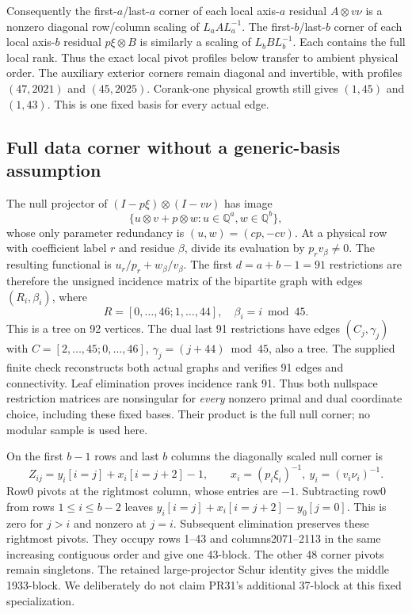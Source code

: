 \documentclass[11pt]{article}
\begin{document}
Consequently the first-$a$/last-$a$ corner of each local axis-$a$ residual
$A\otimes v\nu$ is a nonzero diagonal row/column scaling of $L_aAL_a^{-1}$.
The first-$b$/last-$b$ corner of each local axis-$b$ residual $p\xi\otimes B$
is similarly a scaling of $L_bBL_b^{-1}$. Each contains the full local rank.
Thus the exact local pivot profiles below transfer to ambient physical order.
The auxiliary exterior corners remain diagonal and invertible, with profiles
$(47,2021)$ and $(45,2025)$. Corank-one physical growth still gives
$(1,45)$ and $(1,43)$. This is one fixed basis for every actual edge.

\subsection{Full data corner without a generic-basis assumption}
The null projector of $(I-p\xi)\otimes(I-v\nu)$ has image
\[
 \{u\otimes v+p\otimes w:u\in\mathbb Q^a,w\in\mathbb Q^b\},
\]
whose only parameter redundancy is $(u,w)=(cp,-cv)$. At a physical row
with coefficient label $r$ and residue $\beta$, divide its evaluation by
$p_rv_\beta\ne0$. The resulting functional is $u_r/p_r+w_\beta/v_\beta$.
The first $d=a+b-1=91$ restrictions are therefore the unsigned incidence
matrix of the bipartite graph with edges $(R_i,\beta_i)$, where
\[
 R=[0,\ldots,46;1,\ldots,44],\quad \beta_i=i\bmod45.
\]
This is a tree on 92 vertices. The dual last 91 restrictions have edges
$(C_j,\gamma_j)$ with
$C=[2,\ldots,45;0,\ldots,46]$, $\gamma_j=(j+44)\bmod45$, also a tree.
The supplied finite check reconstructs both actual graphs and verifies
91 edges and connectivity. Leaf elimination proves incidence rank 91.
Thus both nullspace restriction matrices are nonsingular for \emph{every}
nonzero primal and dual coordinate choice, including these fixed bases.
Their product is the full null corner; no modular sample is used here.

On the first $b-1$ rows and last $b$ columns the diagonally scaled null
corner is
\[
 Z_{ij}=y_i[i=j]+x_i[i=j+2]-1,\qquad
 x_i=(p_i\xi_i)^{-1},\ y_i=(v_i\nu_i)^{-1}.
\]
Row0 pivots at the rightmost column, whose entries are $-1$. Subtracting
row0 from rows $1\le i\le b-2$ leaves
$y_i[i=j]+x_i[i=j+2]-y_0[j=0]$. This is zero for $j>i$ and nonzero at $j=i$.
Subsequent elimination preserves these rightmost pivots. They occupy rows
1--43 and columns2071--2113 in the same increasing contiguous order and
give one 43-block. The other 48 corner pivots remain singletons. The retained
large-projector Schur identity gives the middle 1933-block. We deliberately
do not claim PR31's additional 37-block at this fixed specialization.
\end{document}
